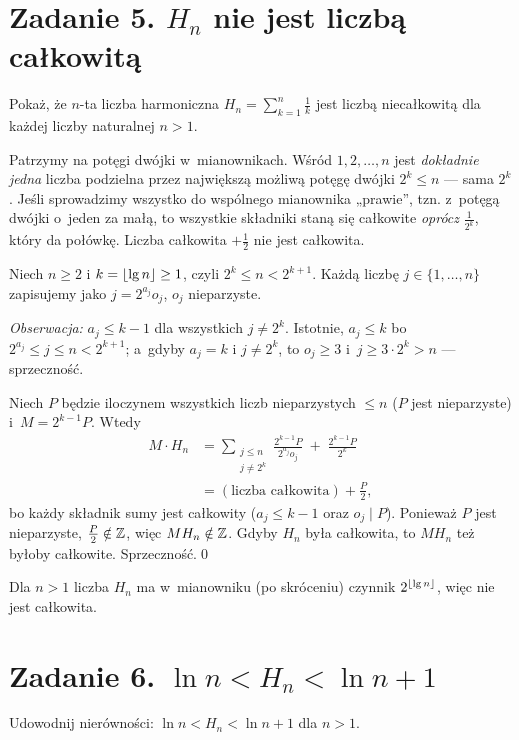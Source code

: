 \documentclass[11pt]{article}
\begin{document}
\section{Zadanie 5. \texorpdfstring{$H_n$}{H(n)} nie jest liczbą całkowitą}
\begin{tresc}
Pokaż, że $n$-ta liczba harmoniczna $H_n=\sum_{k=1}^n\frac1k$ jest liczbą
niecałkowitą dla każdej liczby naturalnej $n>1$.
\end{tresc}

\begin{intuicja}
Patrzymy na potęgi dwójki w~mianownikach. Wśród $1,2,\ldots,n$ jest
\emph{dokładnie jedna} liczba podzielna przez największą możliwą potęgę
dwójki $2^k\le n$ --- sama $2^k$. Jeśli sprowadzimy wszystko do wspólnego
mianownika „prawie”, tzn. z~potęgą dwójki o~jeden za małą, to wszystkie
składniki staną się całkowite \emph{oprócz} $\frac{1}{2^k}$, który da połówkę.
Liczba całkowita $+\frac12$ nie jest całkowita.
\end{intuicja}
\formalnie
Niech $n\ge2$ i $k=\left\lfloor \operatorname{lg} n \right\rfloor\ge 1$, czyli $2^k\le n<2^{k+1}$. Każdą liczbę
$j\in\{1,\dots,n\}$ zapisujemy jako $j=2^{a_j}o_j$, $o_j$ nieparzyste.

\textit{Obserwacja:} $a_j\le k-1$ dla wszystkich $j\ne 2^k$. Istotnie, $a_j\le k$
bo $2^{a_j}\le j\le n<2^{k+1}$; a~gdyby $a_j=k$ i $j\ne 2^k$, to $o_j\ge3$
i~$j\ge 3\cdot2^k>n$ --- sprzeczność.

Niech $P$ będzie iloczynem wszystkich liczb nieparzystych $\le n$ ($P$ jest
nieparzyste) i~$M=2^{k-1}P$. Wtedy
\begin{align*}
M\cdot H_n &= \sum_{\substack{j\le n\\ j\ne 2^k}} \frac{2^{k-1}P}{2^{a_j}o_j} \;+\; \frac{2^{k-1}P}{2^k}\\
&= (\text{liczba całkowita}) + \frac{P}{2},
\end{align*}
bo każdy składnik sumy jest całkowity ($a_j\le k-1$ oraz $o_j\mid P$).
Ponieważ $P$ jest nieparzyste, $\frac P2\notin\mathbb{Z}$, więc $MH_n\notin\mathbb{Z}$.
Gdyby $H_n$ była całkowita, to $MH_n$ też byłoby całkowite. Sprzeczność.\qed
\begin{odpowiedz}
Dla $n>1$ liczba $H_n$ ma w~mianowniku (po skróceniu) czynnik $2^{\left\lfloor \operatorname{lg} n \right\rfloor}$, więc nie jest całkowita.
\end{odpowiedz}

\section{Zadanie 6. \texorpdfstring{$\ln n < H_n < \ln n + 1$}{ln n < H(n) < ln n + 1}}
\begin{tresc}
Udowodnij nierówności: $\ln n < H_n < \ln n+1$ dla $n>1$.
\end{tresc}
\end{document}
